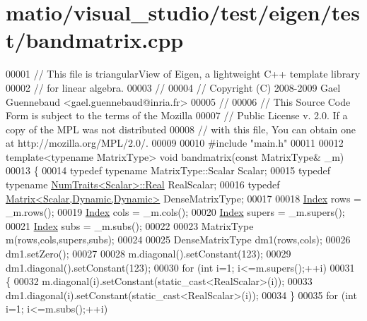 \hypertarget{matio_2visual__studio_2test_2eigen_2test_2bandmatrix_8cpp_source}{}\section{matio/visual\+\_\+studio/test/eigen/test/bandmatrix.cpp}
\label{matio_2visual__studio_2test_2eigen_2test_2bandmatrix_8cpp_source}

\begin{DoxyCode}
00001 \textcolor{comment}{// This file is triangularView of Eigen, a lightweight C++ template library}
00002 \textcolor{comment}{// for linear algebra.}
00003 \textcolor{comment}{//}
00004 \textcolor{comment}{// Copyright (C) 2008-2009 Gael Guennebaud <gael.guennebaud@inria.fr>}
00005 \textcolor{comment}{//}
00006 \textcolor{comment}{// This Source Code Form is subject to the terms of the Mozilla}
00007 \textcolor{comment}{// Public License v. 2.0. If a copy of the MPL was not distributed}
00008 \textcolor{comment}{// with this file, You can obtain one at http://mozilla.org/MPL/2.0/.}
00009 
00010 \textcolor{preprocessor}{#include "main.h"}
00011 
00012 \textcolor{keyword}{template}<\textcolor{keyword}{typename} MatrixType> \textcolor{keywordtype}{void} bandmatrix(\textcolor{keyword}{const} MatrixType& \_m)
00013 \{
00014   \textcolor{keyword}{typedef} \textcolor{keyword}{typename} MatrixType::Scalar Scalar;
00015   \textcolor{keyword}{typedef} \textcolor{keyword}{typename} \hyperlink{group___core___module_struct_eigen_1_1_num_traits}{NumTraits<Scalar>::Real} RealScalar;
00016   \textcolor{keyword}{typedef} \hyperlink{group___core___module}{Matrix<Scalar,Dynamic,Dynamic>} DenseMatrixType;
00017 
00018   \hyperlink{namespace_eigen_a62e77e0933482dafde8fe197d9a2cfde}{Index} rows = \_m.rows();
00019   \hyperlink{namespace_eigen_a62e77e0933482dafde8fe197d9a2cfde}{Index} cols = \_m.cols();
00020   \hyperlink{namespace_eigen_a62e77e0933482dafde8fe197d9a2cfde}{Index} supers = \_m.supers();
00021   \hyperlink{namespace_eigen_a62e77e0933482dafde8fe197d9a2cfde}{Index} subs = \_m.subs();
00022 
00023   MatrixType m(rows,cols,supers,subs);
00024 
00025   DenseMatrixType dm1(rows,cols);
00026   dm1.setZero();
00027 
00028   m.diagonal().setConstant(123);
00029   dm1.diagonal().setConstant(123);
00030   \textcolor{keywordflow}{for} (\textcolor{keywordtype}{int} i=1; i<=m.supers();++i)
00031   \{
00032     m.diagonal(i).setConstant(static\_cast<RealScalar>(i));
00033     dm1.diagonal(i).setConstant(static\_cast<RealScalar>(i));
00034   \}
00035   \textcolor{keywordflow}{for} (\textcolor{keywordtype}{int} i=1; i<=m.subs();++i)

\end{DoxyCode}
